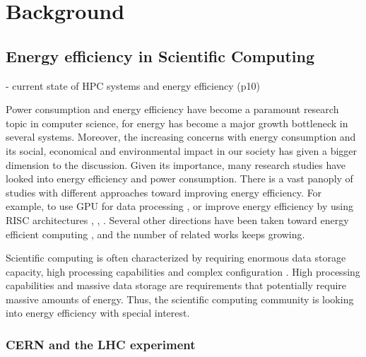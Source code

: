 \chapter{Background}


\section{Energy efficiency in Scientific Computing}


- current state of HPC systems and energy efficiency (p10)


Power consumption and energy efficiency have become a paramount research topic in 
computer science, for energy has become a major growth bottleneck in several systems. 
Moreover, the increasing concerns with energy consumption and its social, economical 
and environmental impact in our society has given a bigger dimension to the discussion.
Given its importance, many research studies have looked into energy efficiency
and power consumption. There is a vast panoply of studies with different
approaches toward improving energy efficiency. For example, to use GPU for data
processing \cite{GPU}, \cite{GREENGPU} or improve energy efficiency by using
RISC architectures \cite{AALTO_ARM} \cite{ACAT13ARM},
\cite{ACAT14ARMDAVID}, . Several other directions have been taken
toward energy efficient computing \cite{QUESTIONS_ENERGY} \cite{GREENING},
\cite{ENERGY_DILEMMA} and the number of related works keeps growing.
 
Scientific computing is often characterized by requiring enormous data storage
capacity, high processing capabilities and complex configuration
\cite{SCICOMPUTING_REQS}. High processing capabilities and massive data storage
are requirements that potentially require massive amounts of energy. Thus, the scientific 
computing community is looking into energy efficiency with special interest.


\subsection{CERN and the LHC experiment}

